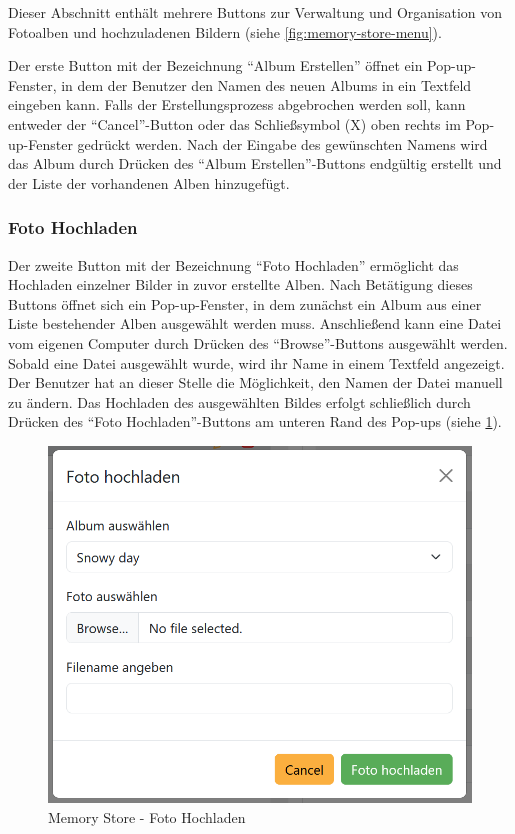 Dieser Abschnitt enthält mehrere Buttons zur Verwaltung und Organisation von Fotoalben 
und hochzuladenen Bildern (siehe \ref{fig:memory-store-menu}).

Der erste Button mit der Bezeichnung ``Album Erstellen'' öffnet ein Pop-up-Fenster, 
in dem der Benutzer den Namen des neuen Albums in ein Textfeld eingeben kann. 
Falls der Erstellungsprozess abgebrochen werden soll, kann entweder der 
``Cancel''-Button oder das Schlie\ss{}symbol (X) oben rechts im Pop-up-Fenster gedrückt 
werden. Nach der Eingabe des gewünschten Namens wird das Album durch Drücken 
des ``Album Erstellen''-Buttons endgültig erstellt und der Liste der vorhandenen 
Alben hinzugefügt.


\subsubsection{Foto Hochladen}

Der zweite Button mit der Bezeichnung ``Foto Hochladen'' ermöglicht das Hochladen 
einzelner Bilder in zuvor erstellte Alben. Nach Betätigung dieses Buttons öffnet 
sich ein Pop-up-Fenster, in dem zunächst ein Album aus einer Liste bestehender Alben 
ausgewählt werden muss. Anschlie\ss{}end kann eine Datei vom eigenen Computer durch 
Drücken des ``Browse''-Buttons ausgewählt werden. Sobald eine Datei ausgewählt wurde, 
wird ihr Name in einem Textfeld angezeigt. Der Benutzer hat an dieser Stelle die 
Möglichkeit, den Namen der Datei manuell zu ändern. Das Hochladen des ausgewählten 
Bildes erfolgt schlie\ss{}lich durch Drücken des ``Foto Hochladen''-Buttons am unteren 
Rand des Pop-ups (siehe \ref{fig:memory-store-foto-hochladen}).

\begin{figure}
    \centering
    \includegraphics[scale=0.4]{pics/memory_store_teil1_button2.PNG}
    \caption{Memory Store - Foto Hochladen}
    \label{fig:memory-store-foto-hochladen}
\end{figure}


